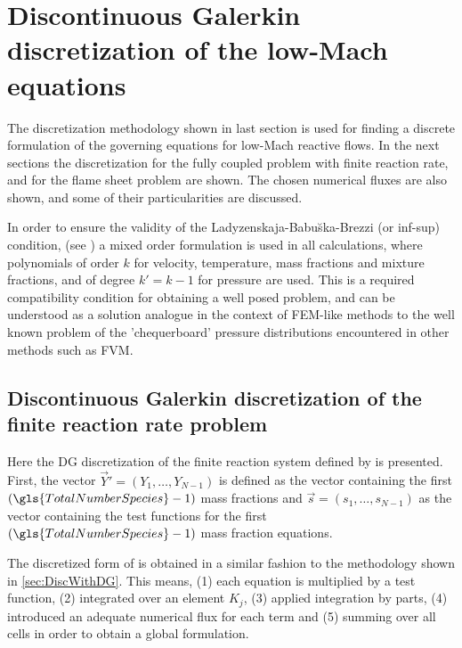 \section{Discontinuous Galerkin discretization of the low-Mach equations}
The discretization methodology shown in last section is used for finding a discrete formulation of the governing equations for low-Mach reactive flows. In the next sections the discretization for the fully coupled problem with finite reaction rate, and for the flame sheet problem are shown. The chosen numerical fluxes are also shown, and some of their particularities are discussed. 

In order to ensure the validity  of the  Ladyzenskaja-Babu\u{s}ka-Brezzi (or inf-sup) condition, (see \textcite{babuskaFiniteElementMethod1973})  a mixed order formulation is used in all calculations, where polynomials of order $k$ for velocity, temperature, mass fractions and mixture fractions, and of degree $k' = k-1$ for pressure are used. This is a required compatibility condition for obtaining a well posed problem, and can be understood as a solution analogue in the context of FEM-like methods to the well known problem of the 'chequerboard' pressure distributions encountered in other methods such as FVM.  \parencite{riceEqualorderVelocitypressureFormulation1986} %
\subsection{Discontinuous Galerkin discretization of the finite reaction rate problem}
Here the DG discretization of the finite reaction system defined by  is presented. 
First, the vector $\vec{Y}' = \left(Y_1,\dots,Y_{N-1}\right)$ is defined as the vector containing the first $(\gls{TotalNumberSpecies}-1)$ mass fractions and $\vec{s} = \left(s_1, \dots, s_{N-1} \right)$ as the vector containing the test functions for the first $(\gls{TotalNumberSpecies}-1)$  mass fraction equations. 

The discretized form of  is obtained in a similar fashion to the methodology shown in \cref{sec:DiscWithDG}. This means, (1) each equation is multiplied by a test function, (2) integrated over an element $K_j$, (3) applied integration by parts, (4) introduced an adequate numerical flux for each term and (5) summing over all cells in order to obtain a global formulation.

